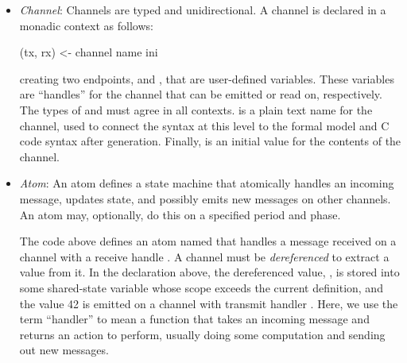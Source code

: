\begin{itemize}
\item \emph{Channel}: Channels are typed and unidirectional. A channel is
declared in a monadic context as follows:
\begin{lima}
(tx, rx) <- channel name ini
\end{lima}
\noindent
creating two endpoints,  and , that are user-defined
variables. These variables are ``handles'' for the channel that can be emitted
or read on, respectively. The types of  and  must agree in all
contexts.  is a plain text name for the channel, used to connect the
syntax at this level to the formal model and C code syntax after generation.
Finally,  is an initial value for the contents of the channel.

%



\item \emph{Atom}: An atom defines a state machine that atomically
handles an incoming message, updates state, and possibly emits new
messages on other channels. An atom may, optionally, do this on a
specified period and phase.
%
%
\noindent
The code above defines an atom named  that handles
a message received on a channel with a receive handle . A channel
must be \emph{dereferenced} to extract a value from it. In the
declaration above, the dereferenced value, , is stored into some
shared-state variable  whose scope exceeds the current definition,
and the value 42 is emitted on a channel with transmit handler . Here,
we use the term ``handler'' to mean a function that takes an incoming message
and returns an action to perform, usually doing some computation and sending
out new messages.


\end{itemize}
